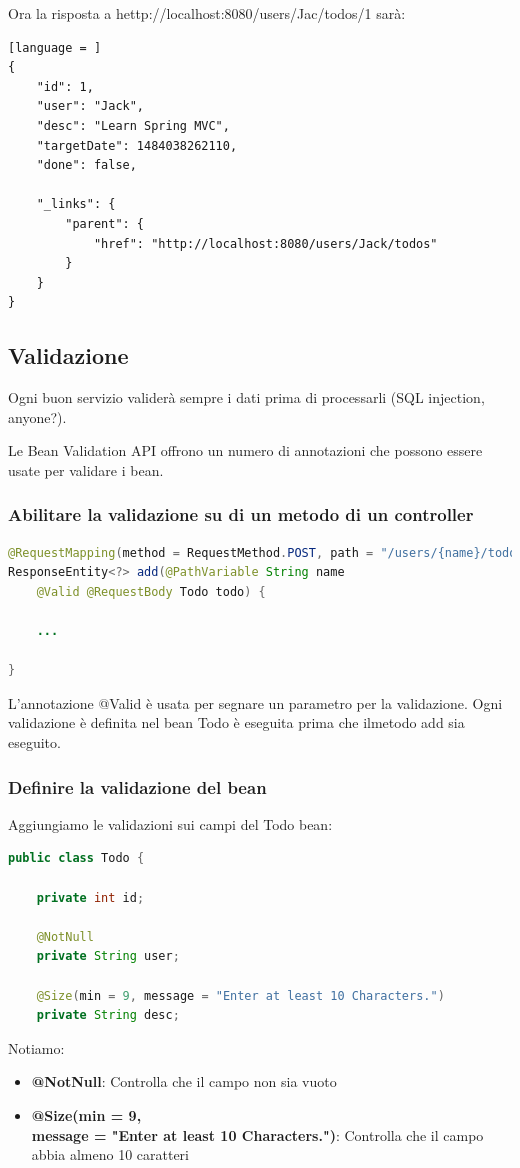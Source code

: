 \documentclass[11pt,a4paper]{book}
\begin{document}
Ora la risposta a hettp://localhost:8080/users/Jac/todos/1 sarà:
\begin{lstlisting}[language = ]
{
	"id": 1,
	"user": "Jack",
	"desc": "Learn Spring MVC",
	"targetDate": 1484038262110,
	"done": false,
	
	"_links": {
		"parent": {
			"href": "http://localhost:8080/users/Jack/todos"
		}
	}
}
\end{lstlisting}

\subsection{Validazione}
Ogni buon servizio validerà sempre i dati prima di processarli (SQL injection, anyone?).

Le Bean Validation API offrono un numero di annotazioni che possono essere usate per validare i bean. 

\subsubsection{Abilitare la validazione su di un metodo di un controller}
\begin{lstlisting}[language = Java]
@RequestMapping(method = RequestMethod.POST, path = "/users/{name}/todos")
ResponseEntity<?> add(@PathVariable String name
	@Valid @RequestBody Todo todo) {
	
	...
	
}
\end{lstlisting}
L'annotazione @Valid è usata per segnare un parametro per la validazione. Ogni validazione è definita nel bean Todo è eseguita prima che ilmetodo add sia eseguito.

\subsubsection{Definire la validazione del bean}
Aggiungiamo le validazioni sui campi del Todo bean:
\begin{lstlisting}[language = Java]
public class Todo {	

	private int id;

	@NotNull
	private String user;
	
	@Size(min = 9, message = "Enter at least 10 Characters.")
	private String desc;
\end{lstlisting}

Notiamo:
\begin{itemize}
	\item \textbf{@NotNull}: Controlla che il campo non sia vuoto
	\item \textbf{@Size(min = 9, \\
		message = "Enter at least 10 Characters.")}: Controlla che il campo abbia almeno 10 caratteri
\end{itemize}
\end{document}
